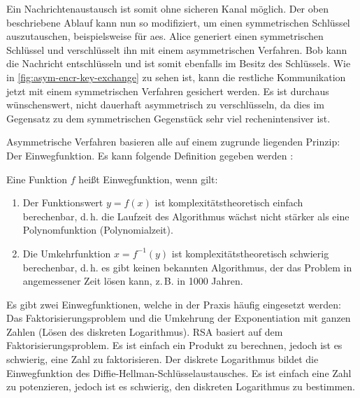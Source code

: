 

\noindent
Ein Nachrichtenaustausch ist somit ohne sicheren Kanal möglich. Der oben beschriebene
Ablauf kann nun so modifiziert, um einen symmetrischen Schlüssel auszutauschen, beispielsweise
für \acs{aes}. Alice generiert einen symmetrischen Schlüssel und verschlüsselt ihn mit einem
asymmetrischen Verfahren. Bob kann die Nachricht entschlüsseln und ist somit ebenfalls
im Besitz des Schlüssels. Wie in \autoref{fig:asym-encr-key-exchange} zu sehen ist,
kann die restliche Kommunikation jetzt mit einem symmetrischen
Verfahren gesichert werden. Es ist durchaus wünschenswert, nicht dauerhaft asymmetrisch
zu verschlüsseln, da dies im Gegensatz zu dem symmetrischen Gegenstück sehr viel
rechenintensiver ist.
\newpage



\noindent
Asymmetrische Verfahren basieren alle auf einem zugrunde liegenden Prinzip:
Der Einwegfunktion. Es kann folgende
Definition gegeben werden \parencite[153]{BOOK:crypto}:

\begin{definition}[Einwegfunktion]
  Eine Funktion $f$ heißt Einwegfunktion, wenn gilt:
  \begin{enumerate}
    \item Der Funktionswert $y = f(x)$ ist komplexitätstheoretisch einfach berechenbar,
          d.\,h. die Laufzeit des Algorithmus wächst
          nicht stärker als eine Polynomfunktion (Polynomialzeit).
    \item Die Umkehrfunktion $x = f^{-1}(y)$ ist komplexitätstheoretisch schwierig berechenbar,
          d.\,h. es gibt keinen bekannten Algorithmus, der das Problem in angemessener
          Zeit lösen kann, z.\,B. in 1000 Jahren.
  \end{enumerate}
\end{definition}

\noindent
Es gibt zwei Einwegfunktionen, welche in der Praxis häufig eingesetzt werden:
Das Faktorisierungsproblem und die Umkehrung der Exponentiation mit ganzen Zahlen
(Lösen des diskreten Logarithmus).
RSA basiert auf dem Faktorisierungsproblem.
Es ist einfach ein Produkt zu berechnen, jedoch ist es schwierig, eine Zahl zu
faktorisieren.
Der diskrete Logarithmus bildet die Einwegfunktion des
Diffie-Hellman-Schlüsselaustausches.
Es ist einfach eine Zahl zu potenzieren, jedoch ist es schwierig,
den diskreten Logarithmus zu bestimmen.
\newpage

